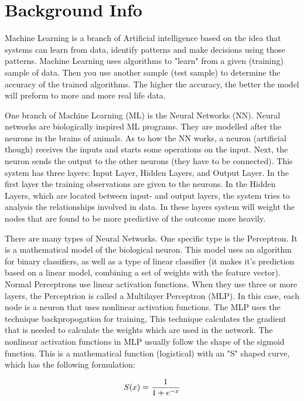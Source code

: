 \section{Background Info}

Machine Learning is a branch of Artificial intelligence based on the idea that systems can learn from data, identify patterns and make decisions using those patterns.
Machine Learning uses algorithms to "learn" from a given  (training) sample of data.
Then you use another sample (test sample) to determine the accuracy of the trained algorithms.
The higher the accuracy, the better the model will preform to more and more real life data.

One branch of Machine Learning (ML) is the Neural Networks (NN).
Neural networks are biologically inspired ML programs.
They are modelled after the neurons in the brains of animals.
As to how the NN works, a neuron (artificial though) receives the inputs and starts some operations on the input.
Next, the neuron sends the output to the other neurons (they have to be connected).
This system has three layers: Input Layer, Hidden Layers, and Output Layer.
In the first layer the training observations are given to the neurons.
In the Hidden Layers, which are located between input- and output layers, the system tries to analysis the relationships involved in data.
In these layers system will weight the nodes that are found to be more predictive of the outcome more heavily.

There are many types of Neural Networks.
One specific type is the Perceptron.
It is a mathematical model of the biological neuron.
This model uses an algorithm for binary classifiers, as well as a type of linear classifier (it makes it's prediction based on a linear model, combining a set of weights with the feature vector).
Normal Perceptrons use linear activation functions.
When they use three or more layers, the Perceptrion is called a Multilayer Perceptron (MLP).
In this case, each node is a neuron that uses nonlinear activation functions.
The MLP uses the technique backpropogation for training,
This technique calculates the gradient that is needed to calculate the weights which are used in the network.
The nonlinear activation functions in MLP usually follow the shape of the sigmoid function.
This is a mathematical function (logistical) with an "S" shaped curve, which has the following formulation:

\begin{equation*}
  \centering
  S(x)=\frac{1}{1+e^{-x}}
\end{equation*}


